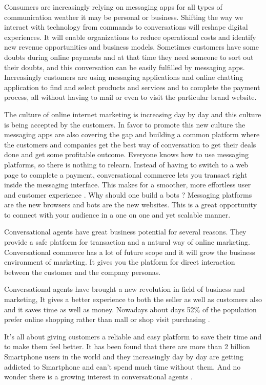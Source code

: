 



Consumers are increasingly relying on messaging apps for all types of communication weather it may be personal or business.
Shifting the way we interact with technology from commands to conversations will reshape digital experiences. It will enable organizations to reduce operational costs and identify new revenue opportunities and business models. Sometimes customers have some doubts during online payments and at that time they need someone to sort out their doubts, and this conversation can be easily fulfilled by messaging apps. Increasingly customers are using messaging applications and online chatting application to find and select products and services and to complete the payment process, all without having to mail or even to visit the particular brand website. 

The culture of online internet marketing is increasing day by day and this culture is being accepted by the customers. In favor to promote this new culture the messaging apps are also covering the gap and building a common platform where the customers and companies get the best way of conversation to get their deals done and get some profitable outcome. Everyone knows how to use messaging platforms, so there is nothing to relearn. Instead of having to switch to a web page to complete a payment, conversational commerce lets you transact right inside the messaging interface. This makes for a smoother, more effortless user and customer experience \cite{piyush2016}. Why should one build a bots ? Messaging platforms are the new browsers and bots are the new websites. This is a great opportunity to connect with your audience in a one on one and yet scalable manner.

Conversational agents have great business potential for several reasons. They provide a safe platform for transaction and a natural way of online marketing. Conversational commerce has a lot of future scope and it will grow the business environment of marketing. It gives you the platform for direct interaction between the customer and the company personas.

Conversational agents have brought a new revolution in field of business and marketing, It gives a better experience to both the seller as well as customers also and it saves time as well as money. Nowadays about days 52\% of the population prefer online shopping rather than mall or shop visit purchasing \cite{piyush2016}.

It's all about giving customers a reliable and easy platform to save their time and to make them feel better. It has been found that there are more than 2 billion Smartphone users in the world and they increasingly day by day are getting addicted to Smartphone and can't spend much time without them. And no wonder there is a growing interest in conversational agents \cite{piyush2016}.